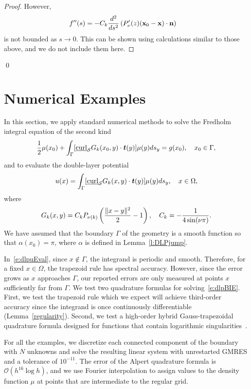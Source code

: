 \begin{proof}
However,
\begin{align*} 
  f''(s) &= -C_k \frac{d^2}{ds^2}\left( P'_\nu(z) 
  (\mathbf{x}_{0}-\mathbf{x}) \cdot \mathbf{n} \right)
\end{align*}
is not bounded as $s\rightarrow 0$. This can be shown using calculations
similar to those above, and we do not include them here.
\end{proof}
\qed


\section{Numerical Examples}
\label{s:numerics}
In this section, we apply standard numerical methods to solve the
Fredholm integral equation of the second kind
\begin{align}
  \label{e:dlpBIE}
  \frac{1}{2}\mu(x_{0}) + \int_{\Gamma}
    [\underline{\mbox{curl}}_{\S}G_{k}(x_{0},y) \cdot
    \vec{t}(y)] \mu(y)ds_{y} = g(x_{0}), \quad x_{0} \in \Gamma,
\end{align}
and to evaluate the double-layer potential
\begin{align}
  \label{e:dlpuEval}
  u(x) = \int_{\Gamma} [\underline{\mbox{curl}}_{\S}G_{k}(x,y) 
    \cdot \vec{t}(y)] \mu(y)ds_{y}, \quad x \in \Omega,
\end{align}
where
\begin{align*}
  G_{k}(x,y) = C_k P_{\nu(k)} \left(
    \frac{\|x - y\|^{2}}{2} - 1\right), \quad 
  C_k=-\frac{1}{4\sin(\nu\pi)}.
\end{align*}
We have assumed that the boundary $\Gamma$ of the geometry is a smooth
function so that $\alpha(x_{0}) = \pi$, where $\alpha$ is defined in
Lemma~\ref{l:DLPjump}.

In~\eqref{e:dlpuEval}, since $x \notin \Gamma$, the integrand is
periodic and smooth.  Therefore, for a fixed $x\in \Omega$, the
trapezoid rule has spectral accuracy.  However, since the error grows as
$x$ approaches $\Gamma$, our reported errors are only measured at points
$x$ sufficiently far from $\Gamma$.  We test two quadrature formulas for
solving~\eqref{e:dlpBIE}.  First, we test the trapezoid rule which we
expect will achieve third-order accuracy since the integrand is once
continuously differentiable (Lemma~\ref{regularity}).  Second, we test a
high-order hybrid Gauss-trapezoidal quadrature formula designed for
functions that contain logarithmic singularities~\cite{alpert}.

For all the examples, we discretize each connected component of the
boundary with $N$ unknowns and solve the resulting linear system with
unrestarted GMRES and a tolerance of $10^{-11}$.  The error of the
Alpert quadrature formula is $\mathcal{O}(h^{16}\log h)$, and we use
Fourier interpolation to assign values to the density function $\mu$ at
points that are intermediate to the regular grid.


